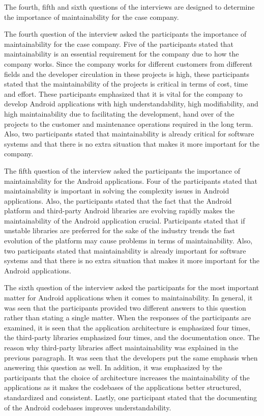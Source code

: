 The fourth, fifth and sixth questions of the interviews are designed to determine the importance of maintainability for the case company.

The fourth question of the interview asked the participants the importance of maintainability for the case company. Five of the participants stated that maintainability is an essential requirement for the company due to how the company works. Since the company works for different customers from different fields and the developer circulation in these projects is high, these participants stated that the maintainability of the projects is critical in terms of cost, time and effort. These participants emphasized that it is vital for the company to develop Android applications with high understandability, high modifiability, and high maintainability due to facilitating the development, hand over of the projects to the customer and maintenance operations required in the long term. Also, two participants stated that maintainability is already critical for software systems and that there is no extra situation that makes it more important for the company.

The fifth question of the interview asked the participants the importance of maintainability for the Android applications. Four of the participants stated that maintainability is important in solving the complexity issues in Android applications. Also, the participants stated that the fact that the Android platform and third-party Android libraries are evolving rapidly makes the maintainability of the Android application crucial. Participants stated  that if unstable libraries are preferred for the sake of the industry trends the fast evolution of the platform may cause problems in terms of maintainability. Also, two participants stated that maintainability is already important for software systems and that there is no extra situation that makes it more important for the Android applications.

The sixth question of the interview asked the participants for the most important matter for Android applications when it comes to maintainability. In general, it was seen that the participants provided two different answers to this question rather than stating a single matter. When the responses of the participants are examined, it is seen that the application architecture is emphasized four times, the third-party libraries emphasized four times, and the documentation once. The reason why third-party libraries affect maintainability was explained in the previous paragraph. It was seen that the developers put the same emphasis when answering this question as well. In addition, it was emphasized by the participants that the choice of architecture increases the maintainability of the applications as it makes the codebases of the applications better structured, standardized and consistent. Lastly, one participant stated that the documenting of the Android codebases improves understandability.